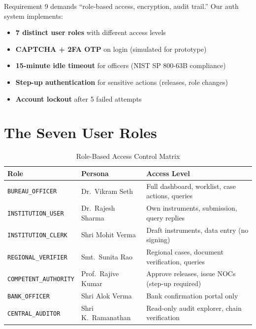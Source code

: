\documentclass[12pt, a4paper]{report}
\begin{document}
\begin{connectionbox}
Requirement 9 demands ``role-based access, encryption, audit trail.'' Our auth system implements:
\begin{itemize}
  \item \textbf{7 distinct user roles} with different access levels
  \item \textbf{CAPTCHA + 2FA OTP} on login (simulated for prototype)
  \item \textbf{15-minute idle timeout} for officers (NIST SP 800-63B compliance)
  \item \textbf{Step-up authentication} for sensitive actions (releases, role changes)
  \item \textbf{Account lockout} after 5 failed attempts
\end{itemize}
\end{connectionbox}

\section{The Seven User Roles}

\begin{table}[H]
\centering
\caption{Role-Based Access Control Matrix}
\label{tab:roles}
\begin{tabularx}{\textwidth}{|l|l|X|}
\hline
\textbf{Role} & \textbf{Persona} & \textbf{Access Level} \\
\hline
\texttt{BUREAU\_OFFICER} & Dr.\ Vikram Seth & Full dashboard, worklist, case actions, queries \\
\hline
\texttt{INSTITUTION\_USER} & Dr.\ Rajesh Sharma & Own instruments, submission, query replies \\
\hline
\texttt{INSTITUTION\_CLERK} & Shri Mohit Verma & Draft instruments, data entry (no signing) \\
\hline
\texttt{REGIONAL\_VERIFIER} & Smt.\ Sunita Rao & Regional cases, document verification, queries \\
\hline
\texttt{COMPETENT\_AUTHORITY} & Prof.\ Rajive Kumar & Approve releases, issue NOCs (step-up required) \\
\hline
\texttt{BANK\_OFFICER} & Shri Alok Verma & Bank confirmation portal only \\
\hline
\texttt{CENTRAL\_AUDITOR} & Shri K.\ Ramanathan & Read-only audit explorer, chain verification \\
\hline
\end{tabularx}
\end{table}
\end{document}
